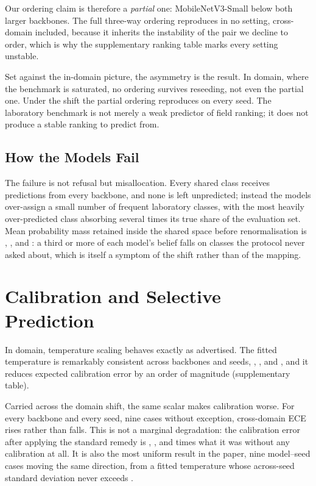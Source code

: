 \documentclass[runningheads]{llncs}
\begin{document}
Our ordering claim is therefore a \emph{partial} one: MobileNetV3-Small below
both larger backbones. The full three-way ordering reproduces in no setting,
cross-domain included, because it inherits the instability of the pair we
decline to order, which is why the supplementary ranking table marks every
setting unstable.

Set against the in-domain picture, the asymmetry is the result. In domain, where
the benchmark is saturated, no ordering survives reseeding, not even the partial
one. Under the shift the partial ordering reproduces on every seed. The
laboratory benchmark is not merely a weak predictor of field ranking; it does
not produce a stable ranking to predict from.

\subsection{How the Models Fail}

The failure is not refusal but misallocation. Every shared class receives
predictions from every backbone, and none is left unpredicted; instead the
models over-assign a small number of frequent laboratory classes, with the most
heavily over-predicted class absorbing several times its true share of the
evaluation set. Mean probability mass retained inside the shared space before
renormalisation is \RetainedMassRn{}, \RetainedMassEb{}, and \RetainedMassMn{}:
a third or more of each model's belief falls on classes the protocol never asked
about, which is itself a symptom of the shift rather than of the mapping.

\section{Calibration and Selective Prediction}
\label{sec:calibration}

In domain, temperature scaling behaves exactly as advertised. The fitted
temperature is remarkably consistent across backbones and seeds, \TempPvRn{},
\TempPvEb{}, and \TempPvMn{}, and it reduces expected calibration error by an
order of magnitude (supplementary table).

Carried across the domain shift, the same scalar makes calibration worse. For
every backbone and every seed, nine cases without exception, cross-domain ECE
rises rather than falls. This is not a marginal degradation: the calibration
error after applying the standard remedy is \EceRatioRn{}, \EceRatioEb{}, and
\EceRatioMn{} times what it was without any calibration at all. It is also the
most uniform result in the paper, nine model--seed cases moving the same
direction, from a fitted temperature whose across-seed standard deviation never
exceeds \TempSdMax{}.
\end{document}
